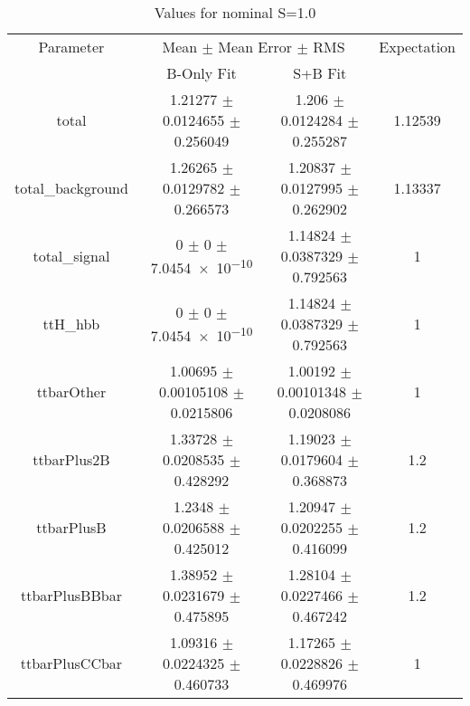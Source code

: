\begin{table}
\centering
\caption{Values for nominal S=1.0}
\begin{tabular}{cccc}
\toprule
Parameter & \multicolumn{2}{c}{Mean $\pm$ Mean Error $\pm$ RMS} & Expectation\\
 & B-Only Fit & S+B Fit & \\
\midrule
total & \num{1.21277} $\pm$ \num{0.0124655} $\pm$ \num{0.256049} & \num{1.206} $\pm$ \num{0.0124284} $\pm$ \num{0.255287} & \num{1.12539}\\
total\_background & \num{1.26265} $\pm$ \num{0.0129782} $\pm$ \num{0.266573} & \num{1.20837} $\pm$ \num{0.0127995} $\pm$ \num{0.262902} & \num{1.13337}\\
total\_signal & \num{0} $\pm$ \num{0} $\pm$ \num{7.0454e-10} & \num{1.14824} $\pm$ \num{0.0387329} $\pm$ \num{0.792563} & \num{1}\\
ttH\_hbb & \num{0} $\pm$ \num{0} $\pm$ \num{7.0454e-10} & \num{1.14824} $\pm$ \num{0.0387329} $\pm$ \num{0.792563} & \num{1}\\
ttbarOther & \num{1.00695} $\pm$ \num{0.00105108} $\pm$ \num{0.0215806} & \num{1.00192} $\pm$ \num{0.00101348} $\pm$ \num{0.0208086} & \num{1}\\
ttbarPlus2B & \num{1.33728} $\pm$ \num{0.0208535} $\pm$ \num{0.428292} & \num{1.19023} $\pm$ \num{0.0179604} $\pm$ \num{0.368873} & \num{1.2}\\
ttbarPlusB & \num{1.2348} $\pm$ \num{0.0206588} $\pm$ \num{0.425012} & \num{1.20947} $\pm$ \num{0.0202255} $\pm$ \num{0.416099} & \num{1.2}\\
ttbarPlusBBbar & \num{1.38952} $\pm$ \num{0.0231679} $\pm$ \num{0.475895} & \num{1.28104} $\pm$ \num{0.0227466} $\pm$ \num{0.467242} & \num{1.2}\\
ttbarPlusCCbar & \num{1.09316} $\pm$ \num{0.0224325} $\pm$ \num{0.460733} & \num{1.17265} $\pm$ \num{0.0228826} $\pm$ \num{0.469976} & \num{1}\\
\bottomrule
\end{tabular}
\end{table}